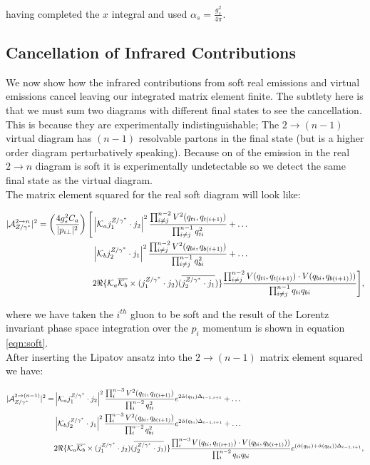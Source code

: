 			having completed the $x$ integral and used $\alpha_s=\frac{g_s^2}{4\pi}$.

		\subsection{Cancellation of Infrared Contributions}
		\label{sub:subsection_name}

			We now show how the infrared contributions from soft real emissions and virtual emissions cancel leaving our integrated matrix element finite.  The subtlety here is that we must sum two diagrams with different final states to see the cancellation.  This is because they are experimentally indistinguishable;  The $2\rightarrow (n-1)$ virtual diagram has $(n-1)$ resolvable partons in the final state (but is a higher order diagram perturbatively speaking).  Because on of the emission in the real $2\rightarrow n$ diagram is soft it is experimentally undetectable so we detect the same final state as the virtual diagram.\\The matrix element squared for the real soft diagram will look like:

			\begin{align}
			|\mathcal{A}_{Z/\gamma^*}^{2\rightarrow n}|^2 = \left(\frac{4g_s^2C_a}{|p_{i\perp}|^2}\right)\Bigg[&\left|\mathcal{K}_a j_1^{Z/\gamma^*}\cdot j_2\right|^2 \frac{\prod^{n-2}_{i\neq j}V^2(q_{ti}, q_{t(i+1)})}{\prod^{n-1}_{i\neq j}q^2_{ti}} + \ldots \\		&\left|\mathcal{K}_b j_2^{Z/\gamma^*}\cdot j_1\right|^2 \frac{\prod^{n-2}_{i\neq j}V^2(q_{bi}, q_{b(i+1)})}{\prod^{n-1}_{i\neq j}q^2_{bi}} + \ldots \\
			&2\Re\{\mathcal{K}_a\overline{\mathcal{K}_b} \times (j_1^{Z/\gamma^*}\cdot j_2)(\overline{j_2^{Z/\gamma^*}\cdot j_1})\} \frac{\prod^{n-2}_{i\neq j}V(q_{ti}, q_{t(i+1)})\cdot V(q_{bi}, q_{b(i+1)}))}{\prod^{n-1}_{i\neq j}q_{ti}q_{bi}}\Bigg],
			\end{align}

			where we have taken the $i^{th}$ gluon to be soft and the result of the Lorentz invariant phase space integration over the $p_i$ momentum is shown in equation \ref{eqn:soft}.\\After inserting the Lipatov ansatz into the $2\rightarrow (n-1)$ matrix element squared we have:

			\begin{align}
			|\mathcal{A}_{Z/\gamma^*}^{2\rightarrow (n-1)}|^2 = &\left|\mathcal{K}_a j_1^{Z/\gamma^*}\cdot j_2\right|^2 \frac{\prod^{n-3}_{i}V^2(q_{ti}, q_{t(i+1)})}{\prod^{n-2}_{i}q^2_{ti}}e^{2\hat{\alpha}(q_{ti})\Delta_{i-1,i+1}} + \ldots \\
			&\left|\mathcal{K}_b j_2^{Z/\gamma^*}\cdot j_1\right|^2 \frac{\prod^{n-3}_{i}V^2(q_{bi}, q_{b(i+1)})}{\prod^{n-2}_{i}q^2_{bi}}e^{2\hat{\alpha}(q_{bi})\Delta_{i-1,i+1}} + \ldots \\
			&2\Re\{\mathcal{K}_a\overline{\mathcal{K}_b} \times (j_1^{Z/\gamma^*}\cdot j_2)(\overline{j_2^{Z/\gamma^*}\cdot j_1})\} \frac{\prod^{n-3}_{i}V(q_{ti}, q_{t(i+1)})\cdot V(q_{bi}, q_{b(i+1)}))}{\prod^{n-2}_{i}q_{ti}q_{bi}}e^{(\hat{\alpha}(q_{bi}) + \hat{\alpha}(q_{bi}))\Delta_{i-1,i+1}},
			\end{align}

